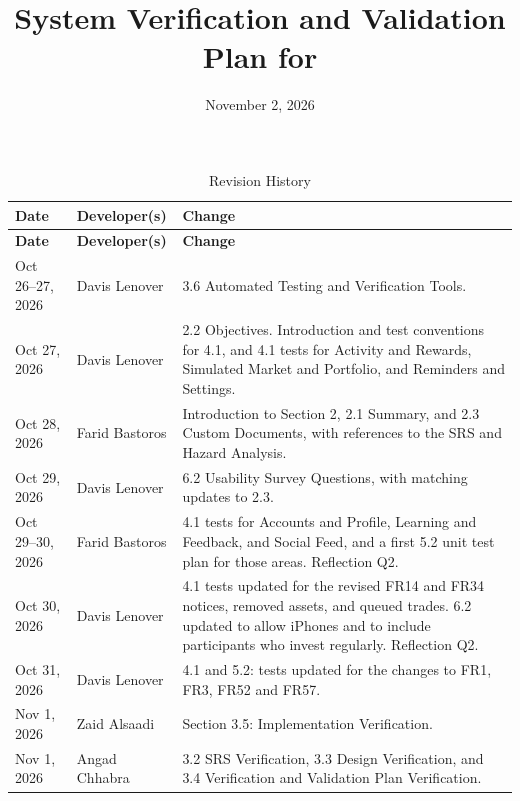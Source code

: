 \documentclass[12pt, titlepage]{article}
\begin{document}
\title{System Verification and Validation Plan for \progname{}} 
\author{\authname}
\date{November 2, 2026}
	
\maketitle


\begin{xltabular}{\textwidth}{llX}
\caption{Revision History} \label{TblRevisionHistory}\\
\toprule
\textbf{Date} & \textbf{Developer(s)} & \textbf{Change}\\
\midrule
\endfirsthead
\toprule
\textbf{Date} & \textbf{Developer(s)} & \textbf{Change}\\
\midrule
\endhead
Oct 26--27, 2026 & Davis Lenover & 3.6 Automated Testing and Verification Tools.\\
Oct 27, 2026 & Davis Lenover & 2.2 Objectives. Introduction and test conventions
  for 4.1, and 4.1 tests for Activity and Rewards, Simulated Market and
  Portfolio, and Reminders and Settings.\\
Oct 28, 2026 & Farid Bastoros & Introduction to Section 2, 2.1 Summary, and 2.3
  Custom Documents, with references to the SRS and Hazard Analysis.\\
Oct 29, 2026 & Davis Lenover & 6.2 Usability Survey Questions, with matching
  updates to 2.3.\\
Oct 29--30, 2026 & Farid Bastoros & 4.1 tests for Accounts and Profile, Learning
  and Feedback, and Social Feed, and a first 5.2 unit test plan for those
  areas. Reflection Q2.\\
Oct 30, 2026 & Davis Lenover & 4.1 tests updated for the revised FR14 and FR34
  notices, removed assets, and queued trades. 6.2 updated to allow iPhones and
  to include participants who invest regularly. Reflection Q2.\\
Oct 31, 2026 & Davis Lenover & 4.1 and 5.2: tests updated for the changes to FR1,
  FR3, FR52 and FR57.\\
Nov 1, 2026 & Zaid Alsaadi & Section 3.5: Implementation Verification.\\
Nov 1, 2026 & Angad Chhabra & 3.2 SRS Verification, 3.3 Design Verification,
  and 3.4 Verification and Validation Plan Verification.\\

\end{xltabular}
\end{document}

